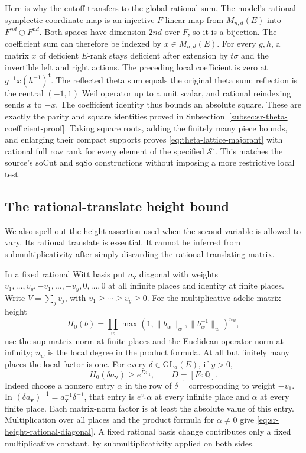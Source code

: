 Here is why the cutoff transfers to the global rational
sum. The model's rational symplectic-coordinate map is
an injective \(F\)-linear map from \(M_{n,d}(E)\) into
\(F^{nd}\oplus F^{nd}\). Both spaces have dimension
\(2nd\) over \(F\), so it is a bijection.
The coefficient sum can therefore be indexed by
\(x\in M_{n,d}(E)\). For every \(g,h\), a matrix
\(x\) of deficient \(E\)-rank stays deficient after
extension by \(t\sigma\) and the invertible left and
right actions. The preceding local coefficient is
zero at \(g^{-1}x(h^{-1})^{\mathsf t}\).
The reflected theta sum equals the original theta sum:
reflection is the central \((-1,1)\) Weil operator
up to a unit scalar, and rational reindexing sends
\(x\) to \(-x\). The coefficient identity thus bounds
an absolute square. These are exactly the parity and
square identities proved in
Subsection~\ref{subsec:sr-theta-coefficient-proof}.
Taking square roots, adding the finitely many piece
bounds, and enlarging their compact supports proves
\eqref{eq:theta-lattice-majorant} with rational full
row rank for every element of the specified
\(\mathcal S^\circ\).
This matches the source's \(\mathrm{soCut}\) and
\(\mathrm{sqSo}\) constructions without imposing
a more restrictive local test.

\subsection{The rational-translate height bound}
\label{subsec:sr-rational-torus-height}
We also spell out the height assertion used when the
second variable is allowed to vary. Its rational
translate is essential. It cannot be inferred from
submultiplicativity after simply discarding the
rational translating matrix.

In a fixed rational Witt basis put
\(a_{\mathbf v}\) diagonal with weights
\(v_1,\ldots,v_y,-v_1,\ldots,-v_y,0,\ldots,0\)
at all infinite places and identity at finite places.
Write \(V=\sum_jv_j\), with
\(v_1\ge\cdots\ge v_y\ge0\).
For the multiplicative adelic matrix height
\[
 H_0(b)=\prod_w
        \max(1,\|b_w\|_w,\|b_w^{-1}\|_w)^{n_w},
\]
use the sup matrix norm at finite places and the
Euclidean operator norm at infinity; \(n_w\) is the
local degree in the product formula. At all but
finitely many places the local factor is one.
For every \(\delta\in\mathrm{GL}_d(E)\), if \(y>0\),
\begin{equation}\label{eq:sr-height-rational-diagonal}
                   H_0(\delta a_{\mathbf v})
                                      \ge e^{D v_1},
                      \qquad D=[E:\mathbb Q].
\end{equation}
Indeed choose a nonzero entry \(\alpha\) in the row
of \(\delta^{-1}\) corresponding to weight \(-v_1\).
In \((\delta a_{\mathbf v})^{-1}
 =a_{\mathbf v}^{-1}\delta^{-1}\), that entry is
\(e^{v_1}\alpha\) at every infinite place and \(\alpha\)
at every finite place. Each matrix-norm factor is at
least the absolute value of this entry. Multiplication
over all places and the product formula for
\(\alpha\ne0\) give \eqref{eq:sr-height-rational-diagonal}.
A fixed rational basis change contributes only a
fixed multiplicative constant, by submultiplicativity
applied on both sides.

